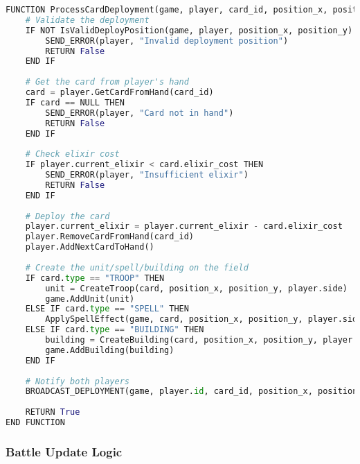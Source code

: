 \documentclass{article}
\begin{document}
\begin{lstlisting}[language=Python, caption=Card Deployment]
FUNCTION ProcessCardDeployment(game, player, card_id, position_x, position_y):
    # Validate the deployment
    IF NOT IsValidDeployPosition(game, player, position_x, position_y) THEN
        SEND_ERROR(player, "Invalid deployment position")
        RETURN False
    END IF
    
    # Get the card from player's hand
    card = player.GetCardFromHand(card_id)
    IF card == NULL THEN
        SEND_ERROR(player, "Card not in hand")
        RETURN False
    END IF
    
    # Check elixir cost
    IF player.current_elixir < card.elixir_cost THEN
        SEND_ERROR(player, "Insufficient elixir")
        RETURN False
    END IF
    
    # Deploy the card
    player.current_elixir = player.current_elixir - card.elixir_cost
    player.RemoveCardFromHand(card_id)
    player.AddNextCardToHand()
    
    # Create the unit/spell/building on the field
    IF card.type == "TROOP" THEN
        unit = CreateTroop(card, position_x, position_y, player.side)
        game.AddUnit(unit)
    ELSE IF card.type == "SPELL" THEN
        ApplySpellEffect(game, card, position_x, position_y, player.side)
    ELSE IF card.type == "BUILDING" THEN
        building = CreateBuilding(card, position_x, position_y, player.side)
        game.AddBuilding(building)
    END IF
    
    # Notify both players
    BROADCAST_DEPLOYMENT(game, player.id, card_id, position_x, position_y)
    
    RETURN True
END FUNCTION
\end{lstlisting}

\subsubsection{Battle Update Logic}
\end{document}
